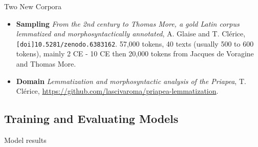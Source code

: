 \documentclass[aspectratio=169]{beamer}
\begin{document}
\begin{frame}{Two New Corpora}

    \begin{itemize}
        \item \textbf{Sampling} \textit{From the 2nd century to Thomas More, a gold Latin corpus lemmatized and morphosyntactically annotated}, A. Glaise and T. Clérice, \texttt{[doi]10.5281/zenodo.6383162}. 57,000 tokens, 40 texts (usually 500 to 600 tokens), mainly 2 CE - 10 CE then 20,000 tokens from Jacques de Voragine and Thomas More.
        \item \textbf{Domain} \textit{Lemmatization and morphosyntactic analysis of the Priapea}, T. Clérice, \url{https://github.com/lascivaroma/priapea-lemmatization}.
    \end{itemize}

\end{frame}

\subsection{Training and Evaluating Models}

\begin{frame}{Model results}
    \vspace{1em}
    \begin{table}[ht]
        \resizebox{.8\linewidth}{!}{%
        \begin{tabular}{l|rrr}
        \toprule
                         & \multicolumn{3}{l}{Accuracy}                           \\
                         & Known Forms & Unknown Forms &  Applicable Forms \\ \midrule
        Lemma            & 97.41          & 92.92            &                    \\
        POS              & 96.49          & 92.45            &                    \\
        Gender           & 96.28          & 91.49            &   89.98            \\
        Number           & 97.02          & 93.85            &   96.44            \\
        Case             & 92.34          & 87.37            &   87.84            \\
        Degree           & 98.07          & 93.96            &   93.37            \\
        Mood Tense Voice & 98.35          & 90.80            &   94.44            \\
        Person           & 99.71          & 98.15            &   98.49            \\ \midrule
        Aggregate Tasks  & 85.86          & 76.68            &                    \\ \bottomrule 
        \end{tabular}
        }
    \end{table}

\end{frame}
\end{document}
